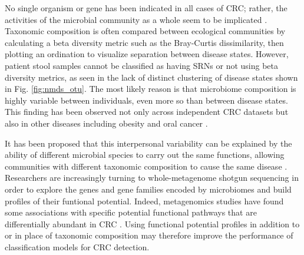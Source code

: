 \documentclass[11pt]{article}
\begin{document}
\begin{figure}
    \vspace{-11pt}
    \vspace{-8pt}
\end{figure}
No single organism or gene has been indicated in all cases of CRC;
rather, the activities of the microbial community as a whole seem to be implicated \cite{louis_gut_2014}.
Taxonomic composition is often compared between ecological communities by calculating a beta diversity metric such as the Bray-Curtis dissimilarity, then plotting an ordination to visualize separation between disease states.
However, patient stool samples cannot be classified as having SRNs or not using beta diversity metrics,
as seen in the lack of distinct clustering of disease states shown in Fig. \ref{fig:nmds_otu}.
The most likely reason is that microbiome composition is highly variable between individuals, even more so than between disease states.
This finding has been observed not only across independent CRC datasets but also in other diseases including obesity and oral cancer \cite{weir_stool_2013, finucane_taxonomic_2014, perera_inflammatory_2018}.

It has been proposed that this interpersonal variability can be explained by the ability of different microbial species to carry out the same functions,
allowing communities with different taxonomic composition to cause the same disease \cite{franzosa_species-level_2018}.
Researchers are increasingly turning to whole-metagenome shotgun sequencing in order to explore the genes and gene families encoded by microbiomes and build profiles of their funtional potential.
Indeed, metagenomics studies have found some associations with specific potential functional pathways that are differentially abundant in CRC \cite{thomas_metagenomic_2019}.
Using functional potential profiles in addition to or in place of taxonomic composition may therefore improve the performance of classification models for CRC detection.
\end{document}
